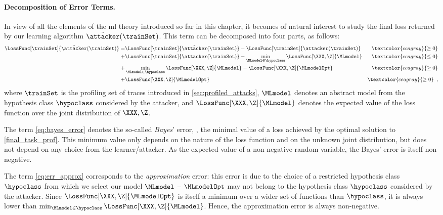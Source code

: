 \paragraph{Decomposition of Error Terms.}
In view of all the elements of the \gls{ml} theory introduced so far in this chapter, it becomes of natural interest to study the final loss returned by our learning algorithm \(\tilde{\attacker}(\trainSet)\).
This term can be decomposed into four parts, as follows:
\begin{eqnarray}
	\LossFunc[\trainSet]{\tilde{\attacker}(\trainSet)}
	= & 
	\LossFunc[\trainSet]{\tilde{\attacker}(\trainSet)} - \LossFunc[\trainSet]{\attacker(\trainSet)} & \textcolor{ceagray}{\geq 0}
	\label{eq:err_opt} \\
	+ &
	\LossFunc[\trainSet]{\attacker(\trainSet)} -  \min_{\MLmodel \in \hypoclass}  \LossFunc[\XXX, \Z]{\MLmodel} & \textcolor{ceagray}{\leq 0}
	\label{eq:err_est} \\
	+ &
	\min_{\MLmodel \in \hypoclass}  \LossFunc[\XXX, \Z]{\MLmodel} - \LossFunc[\XXX, \Z]{\MLmodelOpt} & \textcolor{ceagray}{\geq 0}
	\label{eq:err_approx} \\
	+ &
	\LossFunc[\XXX, \Z]{\MLmodelOpt} & \textcolor{ceagray}{\geq 0} \enspace ,
	\label{eq:bayes_error}
\end{eqnarray}
where \(\trainSet\) is the profiling set of traces introduced in \autoref{sec:profiled_attacks}, \(\MLmodel\) denotes an abstract model from the hypothesis class \(\hypoclass\) considered by the attacker, and \(\LossFunc[\XXX, \Z]{\MLmodel}\) denotes the expected value of the loss function over the joint distribution of \(\XXX, \Z\).

The term \eqref{eq:bayes_error} denotes the so-called \emph{Bayes}' error, \ie{}, the minimal value of a loss achieved by the optimal solution to \autoref{final_task_prof}.
This minimum value only depends on the nature of the loss function and on the unknown joint distribution, but does not depend on any choice from the learner/attacker.
As the expected value of a non-negative random variable, the Bayes' error is itself non-negative.

The term \eqref{eq:err_approx} corresponds to the \emph{approximation} error: this error is due to the choice of a restricted hypothesis class \(\hypoclass\) from which we select our model \(\MLmodel\) -- \eg{} \(\MLmodelOpt\) may not belong to the hypothesis class \(\hypoclass\) considered by the attacker.
Since \(\LossFunc[\XXX, \Z]{\MLmodelOpt}\) is itself a minimum over a wider set of functions than \(\hypoclass\), it is always lower than \(\min_{\MLmodel \in \hypoclass}  \LossFunc[\XXX, \Z]{\MLmodel}\).
Hence, the approximation error is always non-negative.

